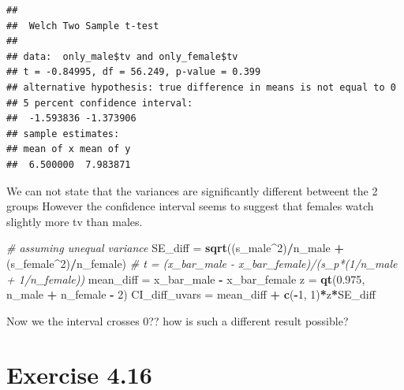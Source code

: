 \documentclass[
]{article}
\newenvironment{Shaded}{\begin{snugshade}}{\end{snugshade}}
\newcommand{\CommentTok}[1]{\textcolor[rgb]{0.56,0.35,0.01}{\textit{#1}}}
\newcommand{\DecValTok}[1]{\textcolor[rgb]{0.00,0.00,0.81}{#1}}
\newcommand{\FloatTok}[1]{\textcolor[rgb]{0.00,0.00,0.81}{#1}}
\newcommand{\FunctionTok}[1]{\textcolor[rgb]{0.13,0.29,0.53}{\textbf{#1}}}
\newcommand{\NormalTok}[1]{#1}
\newcommand{\OtherTok}[1]{\textcolor[rgb]{0.56,0.35,0.01}{#1}}
\newcommand{\SpecialCharTok}[1]{\textcolor[rgb]{0.81,0.36,0.00}{\textbf{#1}}}
\begin{document}
\begin{verbatim}
## 
##  Welch Two Sample t-test
## 
## data:  only_male$tv and only_female$tv
## t = -0.84995, df = 56.249, p-value = 0.399
## alternative hypothesis: true difference in means is not equal to 0
## 5 percent confidence interval:
##  -1.593836 -1.373906
## sample estimates:
## mean of x mean of y 
##  6.500000  7.983871
\end{verbatim}

We can not state that the variances are significantly different betweent
the 2 groups However the confidence interval seems to suggest that
females watch slightly more tv than males.

\begin{Shaded}
\begin{Highlighting}[]
\CommentTok{\# assuming unequal variance}
\NormalTok{SE\_diff }\OtherTok{=} \FunctionTok{sqrt}\NormalTok{((s\_male}\SpecialCharTok{\^{}}\DecValTok{2}\NormalTok{)}\SpecialCharTok{/}\NormalTok{n\_male }\SpecialCharTok{+}\NormalTok{ (s\_female}\SpecialCharTok{\^{}}\DecValTok{2}\NormalTok{)}\SpecialCharTok{/}\NormalTok{n\_female)}
\CommentTok{\# t = (x\_bar\_male {-} x\_bar\_female)/(s\_p*(1/n\_male + 1/n\_female))}
\NormalTok{mean\_diff }\OtherTok{=}\NormalTok{ x\_bar\_male }\SpecialCharTok{{-}}\NormalTok{ x\_bar\_female}
\NormalTok{z }\OtherTok{=} \FunctionTok{qt}\NormalTok{(}\FloatTok{0.975}\NormalTok{, n\_male }\SpecialCharTok{+}\NormalTok{ n\_female }\SpecialCharTok{{-}} \DecValTok{2}\NormalTok{)}
\NormalTok{CI\_diff\_uvars }\OtherTok{=}\NormalTok{ mean\_diff }\SpecialCharTok{+} \FunctionTok{c}\NormalTok{(}\SpecialCharTok{{-}}\DecValTok{1}\NormalTok{, }\DecValTok{1}\NormalTok{)}\SpecialCharTok{*}\NormalTok{z}\SpecialCharTok{*}\NormalTok{SE\_diff}
\end{Highlighting}
\end{Shaded}

Now we the interval crosses 0?? how is such a different result possible?

\hypertarget{exercise-4.16}{%
\section{Exercise 4.16}\label{exercise-4.16}}
\end{document}
